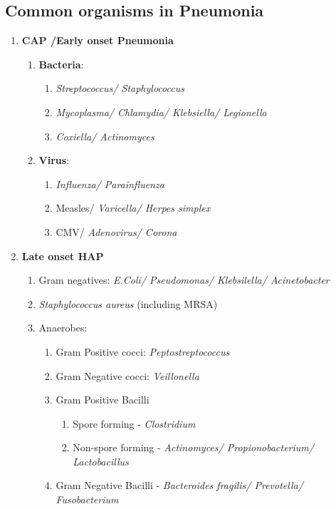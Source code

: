 \documentclass[11pt,a4paper]{report}
\begin{document}
\subsection{Common organisms in Pneumonia}
\begin{enumerate}
	\item \textbf{CAP /Early onset Pneumonia}
	\begin{enumerate}
		\item \textbf{Bacteria}: 
		\begin{enumerate}
			\item \textit{Streptococcus/ Staphylococcus}
			\item \textit{Mycoplasma/ Chlamydia/ Klebsiella/ Legionella}
			\item \textit{Coxiella/ Actinomyces}
		\end{enumerate}
		\item \textbf{Virus}: 
		\begin{enumerate}
			\item \textit{Influenza/ Parainfluenza}
			\item Measles/ \textit{Varicella/ Herpes simplex}
			\item CMV/ \textit{Adenovirus/ Corona}
		\end{enumerate}
	\end{enumerate}
	\item \textbf{Late onset HAP}
	\begin{enumerate}
		\item Gram negatives: \textit{E.Coli/ Pseudomonas/ Klebsilella/ Acinetobacter}
		\item \textit{Staphylococcus aureus} (including MRSA)
		\item Anaerobes: 
		\begin{enumerate}
			\item Gram Positive cocci: \textit{Peptostreptococcus}
			\item Gram Negative cocci: \textit{Veillonella}
			\item Gram Positive Bacilli
			\begin{enumerate}
				\item Spore forming - \textit{Clostridium}
				\item Non-spore forming - \textit{Actinomyces/ Propionobacterium/ Lactobacillus}
			\end{enumerate}
			\item Gram Negative Bacilli - \textit{Bacteroides fragilis/ Prevotella/ Fusobacterium}
		\end{enumerate}
	\end{enumerate}
\end{enumerate}
\end{document}
